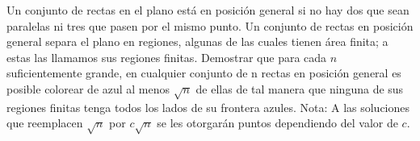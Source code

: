 Un conjunto de rectas en el plano está en posición general si no hay dos que sean paralelas ni tres que pasen por el mismo punto. Un conjunto de rectas en posición general separa el plano en regiones, algunas de las cuales tienen área finita; a estas las llamamos sus regiones finitas. Demostrar que para cada $n$ suficientemente grande, en cualquier conjunto de n rectas en posición general es posible colorear de azul al menos $\sqrt{n}$ de ellas de tal manera que ninguna de sus regiones finitas tenga todos los lados de su frontera azules. \newline 
Nota: A las soluciones que reemplacen $\sqrt{n}$ por $c\sqrt{n}$ se les otorgarán puntos dependiendo del valor de $c$.